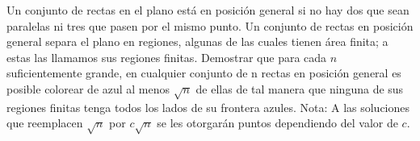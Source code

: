 Un conjunto de rectas en el plano está en posición general si no hay dos que sean paralelas ni tres que pasen por el mismo punto. Un conjunto de rectas en posición general separa el plano en regiones, algunas de las cuales tienen área finita; a estas las llamamos sus regiones finitas. Demostrar que para cada $n$ suficientemente grande, en cualquier conjunto de n rectas en posición general es posible colorear de azul al menos $\sqrt{n}$ de ellas de tal manera que ninguna de sus regiones finitas tenga todos los lados de su frontera azules. \newline 
Nota: A las soluciones que reemplacen $\sqrt{n}$ por $c\sqrt{n}$ se les otorgarán puntos dependiendo del valor de $c$.